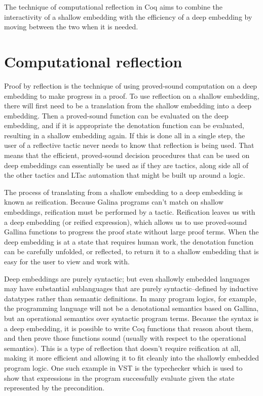 \documentclass{puthesis}
\begin{document}
The technique of computational reflection in Coq aims to combine the
interactivity of a shallow embedding with the efficiency of a deep
embedding by moving between the two when it is needed.

\section{Computational reflection}

Proof by reflection is the technique of using proved-sound computation
on a deep embedding to make progress in a proof. To use reflection on
a shallow embedding, there will first need to be a translation from
the shallow embedding into a deep embedding. Then a proved-sound
function can be evaluated on the deep embedding, and if it is
appropriate the denotation function can be evaluated, resulting in a
shallow embedding again.  If this is done all in a single step, the
user of a reflective tactic never needs to know that reflection is
being used. That means that the efficient, proved-sound decision
procedures that can be used on deep embeddings can essentially be used
as if they are tactics, along side all of the other tactics and LTac
automation that might be built up around a logic.

The process of translating from a shallow embedding to a deep
embedding is known as reification. Because Galina programs can't match on
shallow embeddings, reification must be performed by a
tactic. Reification leaves us with a deep embedding (or reified
expression), which allows us to use proved-sound Gallina functions to
progress the proof state without large proof terms. When the deep
embedding is at a state that requires human work, the denotation
function can be carefully unfolded, or reflected, to return it to a
shallow embedding that is easy for the user to view and work with.


Deep embeddings are purely syntactic; but even shallowly embedded
languages may have substantial sublanguages that are purely
syntactic--defined by inductive datatypes rather than semantic
definitions. In many program logics, for example, the programming
language will not be a denotational semantics based on Gallina, but an
operational semantics over syntactic program terms. Because the syntax
is a deep embedding, it is possible to write Coq functions that reason
about them, and then prove those functions sound (usually with respect
to the operational semantics). This is a type of reflection that
doesn't require reification at all, making it more efficient and
allowing it to fit cleanly into the shallowly embedded program
logic. One such example in VST is the typechecker which is used to
show that expressions in the program successfully evaluate given the
state represented by the precondition.
\end{document}
